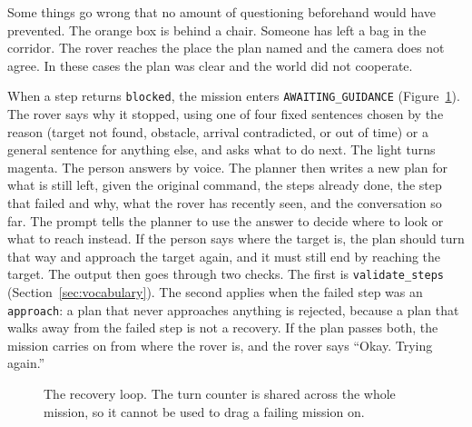 \label{sec:recovery}

Some things go wrong that no amount of questioning beforehand would have
prevented. The orange box is behind a chair. Someone has left a bag in the
corridor. The rover reaches the place the plan named and the camera does not
agree. In these cases the plan was clear and the world did not cooperate.

When a step returns \texttt{blocked}, the mission enters
\texttt{AWAITING\_GUIDANCE} (Figure~\ref{fig:guidance}). The rover says why it
stopped, using one of four fixed sentences chosen by the reason (target not found,
obstacle, arrival contradicted, or out of time) or a general sentence for
anything else, and asks what to do next. The
light turns magenta. The person answers by voice. The planner then writes a new
plan for what is still left, given the original command, the steps already done,
the step that failed and why, what the rover has recently seen, and the
conversation so far. The prompt tells the planner to use the answer to decide
where to look or what to reach instead. If the person says where the target is,
the plan should turn that way and approach the target again, and it must still end
by reaching the target. The output then goes through two checks. The first is
\texttt{validate\_steps} (Section~\ref{sec:vocabulary}). The second applies when
the failed step was an \texttt{approach}: a plan that never approaches anything is
rejected, because a plan that walks away from the failed step is not a recovery.
If the plan passes both, the mission carries on from where the rover is, and the
rover says ``Okay. Trying again.''

\begin{figure}[htbp]
  \centering
  \caption{The recovery loop. The turn counter is shared across the whole mission, so it cannot be used to drag a failing mission on.}
  \label{fig:guidance}
\end{figure}

